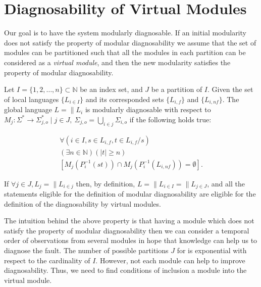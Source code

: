 \documentclass[a4paper, 10pt, conference]{ieeeconf} \IEEEoverridecommandlockouts
\begin{document}
\section{Diagnosability of Virtual Modules}
\label{sec:Proposal}

Our goal is to have the system modularly diagnosable. If an initial modularity
does not satisfy the property of modular diagnosability we assume that the set
of modules can be partitioned such that all the modules in each partition can be
considered as a \emph{virtual module}, and then the new modularity satisfies the
property of modular diagnosability.

\begin{definition} Let $I = \{1,2,\ldots,n\}
\subset  \mathbb{N}$ be an index set, and $J$ be a partition of $I$. Given the
set of local languages $\{L_{i \in I}\}$ and its corresponded sets $\{L_{i,f}\}$
and $\{L_{i,nf}\}$. The global language $L = \parallel L_i$ is modularly
diagnosable with respect to 
$M_j: \Sigma^* \rightarrow \Sigma_{j,o}^* 
\mid j \in J, ~\Sigma_{j,o} =\bigcup_{i \in j} \Sigma_{i,o}$ 
if the following holds true:
\end{definition}
\begin{equation}
\begin{array}{l}
	\forall(i \in I, s \in L_{i,f}, t \in L_{i,f}/s)
	\\
	(\exists n \in \mathbb{N})
	(|t| \geq n)
	\\
	\left[ M_j(P_i^{-1}(st)) \cap M_j(P_i^{-1}(L_{i,nf})) = \emptyset \right].
\end{array}
\end{equation}

If $\forall j \in J, L_{j} = \parallel L_{i \in j}$ then, by definition, $L =
\parallel L_{i \in I} = \parallel L_{j \in J}$, and all the statements eligible
for the definition of modular diagnosability are eligible for the definition of
the diagnosability by virtual modules.

The intuition behind the above property is that having a module which does
not satisfy the property of modular diagnosability then we can consider a
temporal order of observations from several modules in hope that knowledge
can help us to diagnose the fault. The number of possible partitions
$J$ for is exponential with respect to the cardinality of $I$. However, not
each module can help to improve diagnosability. Thus, we need to find conditions
of inclusion a module into the virtual module.
\end{document}
